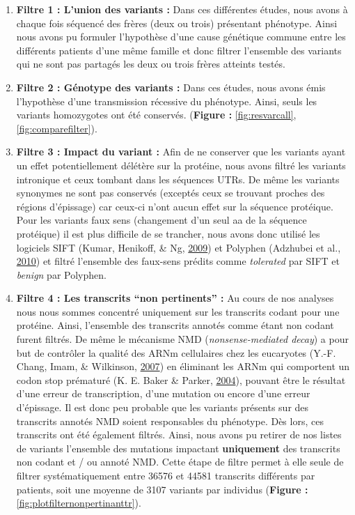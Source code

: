 \documentclass[12pt,twoside]{reedthesis}
\providecommand{\tightlist}{%
  \setlength{\itemsep}{0pt}\setlength{\parskip}{0pt}}
\theoremstyle{definition}
\theoremstyle{definition}
\theoremstyle{remark}
\begin{document}
  \begin{enumerate}
  \def\labelenumi{\arabic{enumi}.}
  \tightlist
  \item
    \textbf{Filtre 1 : L'union des variants :} Dans ces différentes
    études, nous avons à chaque fois séquencé des frères (deux ou trois)
    présentant phénotype. Ainsi nous avons pu formuler l'hypothèse d'une
    cause génétique commune entre les différents patients d'une même
    famille et donc filtrer l'ensemble des variants qui ne sont pas
    partagés les deux ou trois frères atteints testés.\\
  \item
    \textbf{Filtre 2 : Génotype des variants :} Dans ces études, nous
    avons émis l'hypothèse d'une transmission récessive du phénotype.
    Ainsi, seuls les variants homozygotes ont été conservés.
    (\textbf{Figure : }\ref{fig:resvarcall}, \ref{fig:comparefilter}).\\
  \item
    \textbf{Filtre 3 : Impact du variant :} Afin de ne conserver que les
    variants ayant un effet potentiellement délétère sur la protéine, nous
    avons filtré les variants intronique et ceux tombant dans les
    séquences UTRs. De même les variants synonymes ne sont pas conservés
    (exceptés ceux se trouvant proches des régions d'épissage) car ceux-ci
    n'ont aucun effet sur la séquence protéique. Pour les variants faux
    sens (changement d'un seul aa de la séquence protéique) il est plus
    difficile de se trancher, nous avons donc utilisé les logiciels SIFT
    (Kumar, Henikoff, \& Ng, \protect\hyperlink{ref-Kumar2009}{2009}) et
    Polyphen (Adzhubei et al., \protect\hyperlink{ref-Adzhubei2010}{2010})
    et filtré l'ensemble des faux-sens prédits comme \emph{tolerated} par
    SIFT et \emph{benign} par Polyphen.\\
  \item
    \textbf{Filtre 4 : Les transcrits ``non pertinents'' :} Au cours de
    nos analyses nous nous sommes concentré uniquement sur les transcrits
    codant pour une protéine. Ainsi, l'ensemble des transcrits annotés
    comme étant non codant furent filtrés. De même le mécanisme NMD
    (\emph{nonsense-mediated decay}) a pour but de contrôler la qualité
    des ARNm cellulaires chez les eucaryotes (Y.-F. Chang, Imam, \&
    Wilkinson, \protect\hyperlink{ref-Chang2007}{2007}) en éliminant les
    ARNm qui comportent un codon stop prématuré (K. E. Baker \& Parker,
    \protect\hyperlink{ref-Baker2004}{2004}), pouvant être le résultat
    d'une erreur de transcription, d'une mutation ou encore d'une erreur
    d'épissage. Il est donc peu probable que les variants présents sur des
    transcrits annotés NMD soient responsables du phénotype. Dès lors, ces
    transcrits ont été également filtrés. Ainsi, nous avons pu retirer de
    nos listes de variants l'ensemble des mutations impactant
    \textbf{uniquement} des transcrits non codant et / ou annoté NMD.
    Cette étape de filtre permet à elle seule de filtrer systématiquement
    entre 36576 et 44581 transcrits différents par patients, soit une
    moyenne de 3107 variants par individus (\textbf{Figure :
    }\ref{fig:plotfilternonpertinanttr}).
  \end{enumerate}
  
\end{document}
